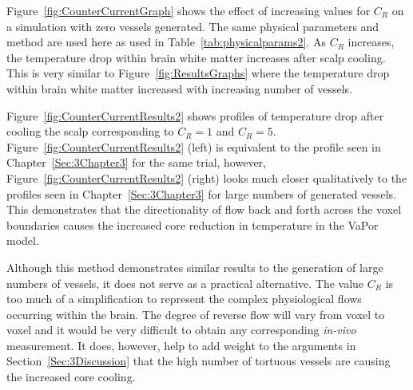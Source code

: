 \documentclass[11pt,english,a4paper,twoside,openright]{report}
\begin{document}
{{{{{{{Figure~\ref{fig:CounterCurrentGraph} shows the effect of increasing values for $C_{R}$ on a simulation with zero vessels generated. The same physical parameters and method are used here as used in Table~\ref{tab:physicalparams2}. As $C_{R}$ increases, the temperature drop within brain white matter increases after scalp cooling. This is very similar to Figure~\ref{fig:ResultsGraphs} where the temperature drop within brain white matter increased with increasing number of vessels. 

Figure~\ref{fig:CounterCurrentResults2} shows profiles of temperature drop after cooling the scalp corresponding to $C_{R}=1$ and $C_{R}=5$. Figure~\ref{fig:CounterCurrentResults2} (left) is equivalent to the profile seen in Chapter~\ref{Sec:3Chapter3} for the same trial, however, Figure~\ref{fig:CounterCurrentResults2} (right) looks much closer qualitatively to the profiles seen in Chapter~\ref{Sec:3Chapter3} for large numbers of generated vessels. This demonstrates that the directionality of flow back and forth across the voxel boundaries causes the increased core reduction in temperature in the VaPor model. 

Although this method demonstrates similar results to the generation of large numbers of vessels, it does not serve as a practical alternative. The value $C_{R}$ is too much of a simplification to represent the complex physiological flows occurring within the brain. The degree of reverse flow will vary from voxel to voxel and it would be very difficult to obtain any corresponding \textit{in-vivo} measurement. It does, however, help to add weight to the arguments in Section~\ref{Sec:3Discussion} that the high number of tortuous vessels are causing the increased core cooling.  

}}}}}}}
\end{document}
